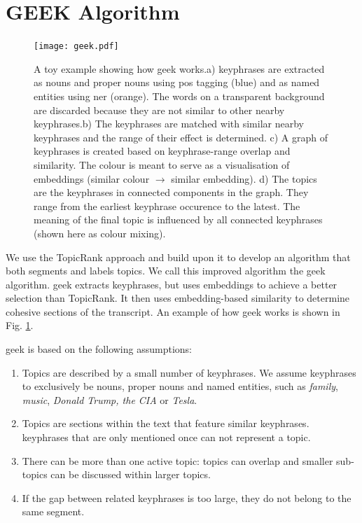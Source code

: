 \section{GEEK Algorithm}

    \begin{figure}
        \centering
        \texttt{[image: geek.pdf]}
        \caption{A toy example showing how \gls{geek} works.\newline a) \Glspl{keyphrase} are extracted as nouns and proper nouns using \gls{pos} tagging (blue) and as named entities using \gls{ner} (orange). The words on a transparent background are discarded because they are not similar to other nearby \glspl{keyphrase}.\newline b) The \glspl{keyphrase} are matched with similar nearby \glspl{keyphrase} and the range of their effect is determined. \newline c) A graph of \glspl{keyphrase} is created based on \gls{keyphrase}-range overlap and similarity. The colour is meant to serve as a visualisation of embeddings (similar colour $\rightarrow$ similar embedding).\newline
        d) The topics are the \glspl{keyphrase} in connected components in the graph. They range from the earliest \gls{keyphrase} occurence to the latest. The meaning of the final topic is influenced by all connected \glspl{keyphrase} (shown here as colour mixing).
        }
        \label{fig:geek architecture}
    \end{figure}

We use the TopicRank approach and build upon it to develop an algorithm that both segments and labels topics. We call this improved algorithm the \gls{geek} algorithm. \gls{geek} extracts \glspl{keyphrase}, but uses \glspl{embedding} to achieve a better selection than TopicRank. It then uses embedding-based similarity to determine cohesive sections of the transcript. An example of how \gls{geek} works is shown in Fig. \ref{fig:geek architecture}.

\gls{geek} is based on the following assumptions:

\begin{enumerate}
    \item Topics are described by a small number of \glspl{keyphrase}. We assume \glspl{keyphrase} to exclusively be nouns, proper nouns and named entities, such as \textit{family}, \textit{music}, \textit{Donald Trump, the CIA} or \textit{Tesla}.
    \item Topics are sections within the text that feature similar \glspl{keyphrase}. \glspl{keyphrase} that are only mentioned once can not represent a topic.
    \item There can be more than one active topic: topics can overlap and smaller sub-topics can be discussed within larger topics.
    \item If the gap between related \glspl{keyphrase} is too large, they do not belong to the same segment.
\end{enumerate}

